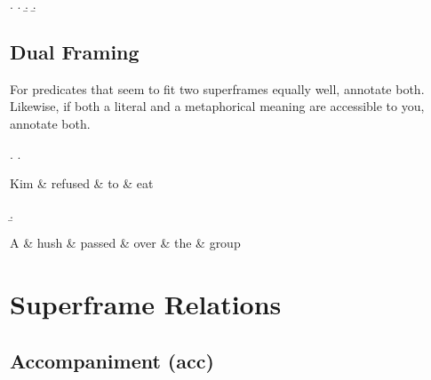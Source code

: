 \documentclass[a4paper]{article}
\begin{document}
\ex.
\a. \label{ex:chase-caused} 
\b. \label{ex:chase-accompanied} 
\b. \label{ex:help-binary} 


\subsection{Dual Framing}

For predicates that seem to fit two superframes equally well, annotate both. Likewise, if both a literal and a metaphorical meaning are accessible to you, annotate both.

\ex.
\a. \begin{dependency}
    \begin{deptext}
        Kim \& refused \& to \& eat \\
    \end{deptext}
\end{dependency}
\b. \begin{dependency}
    \begin{deptext}
        A \& hush \& passed \& over \& the \& group \\
    \end{deptext}
\end{dependency}



\clearpage
\section{Superframe Relations}

\subsection{Accompaniment (\textsf{acc})}
\label{sec:acc}
\end{document}
